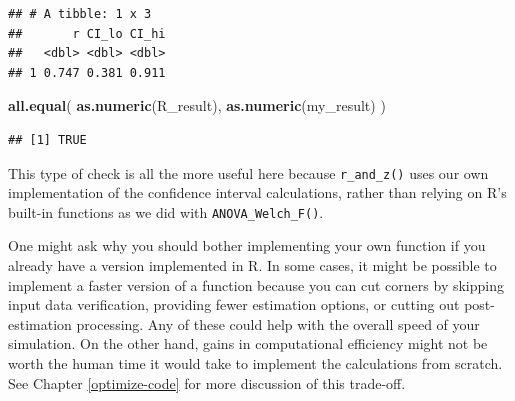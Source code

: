 \documentclass[
]{book}
\newenvironment{Shaded}{\begin{snugshade}}{\end{snugshade}}
\newcommand{\AttributeTok}[1]{\textcolor[rgb]{0.13,0.29,0.53}{#1}}
\newcommand{\DecValTok}[1]{\textcolor[rgb]{0.00,0.00,0.81}{#1}}
\newcommand{\FunctionTok}[1]{\textcolor[rgb]{0.13,0.29,0.53}{\textbf{#1}}}
\newcommand{\NormalTok}[1]{#1}
\newcommand{\OtherTok}[1]{\textcolor[rgb]{0.56,0.35,0.01}{#1}}
\newcommand{\SpecialCharTok}[1]{\textcolor[rgb]{0.81,0.36,0.00}{\textbf{#1}}}
\newcommand{\StringTok}[1]{\textcolor[rgb]{0.31,0.60,0.02}{#1}}
\begin{document}
\begin{Shaded}
\end{Shaded}

\begin{verbatim}
## # A tibble: 1 x 3
##       r CI_lo CI_hi
##   <dbl> <dbl> <dbl>
## 1 0.747 0.381 0.911
\end{verbatim}

\begin{Shaded}
\begin{Highlighting}[]
\FunctionTok{all.equal}\NormalTok{( }\FunctionTok{as.numeric}\NormalTok{(R\_result), }\FunctionTok{as.numeric}\NormalTok{(my\_result) )}
\end{Highlighting}
\end{Shaded}

\begin{verbatim}
## [1] TRUE
\end{verbatim}

This type of check is all the more useful here because \texttt{r\_and\_z()} uses our own implementation of the confidence interval calculations, rather than relying on R's built-in functions as we did with \texttt{ANOVA\_Welch\_F()}.

One might ask why you should bother implementing your own function if you already have a version implemented in R.
In some cases, it might be possible to implement a faster version of a function because you can cut corners by skipping input data verification, providing fewer estimation options, or cutting out post-estimation processing.
Any of these could help with the overall speed of your simulation.
On the other hand, gains in computational efficiency might not be worth the human time it would take to implement the calculations from scratch.
See Chapter \ref{optimize-code} for more discussion of this trade-off.
\end{document}
